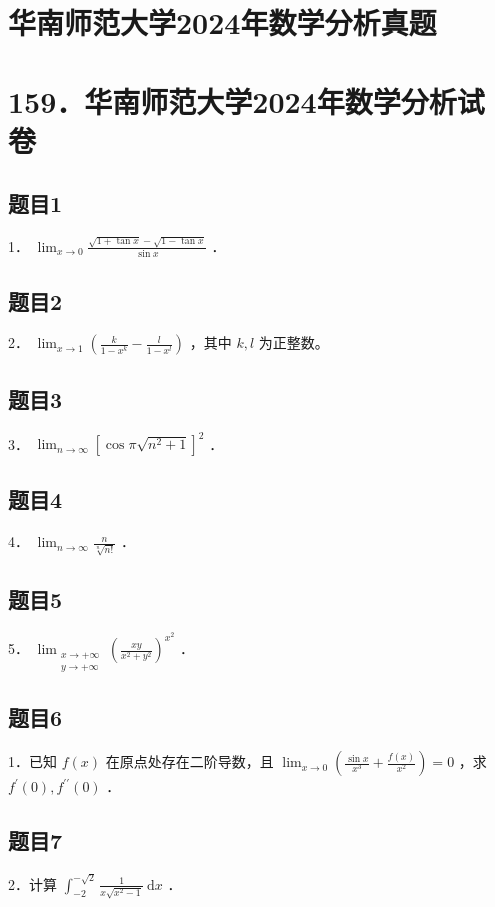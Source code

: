 \documentclass{article}
\begin{document}
\section*{华南师范大学2024年数学分析真题}
\section*{159．华南师范大学2024年数学分析试卷}

\subsection{题目1}
1． \(\lim _{x \rightarrow 0} \frac{\sqrt{1+\tan x}-\sqrt{1-\tan x}}{\sin x}\) ．

\subsection{题目2}
2． \(\lim _{x \rightarrow 1}\left(\frac{k}{1-x^{k}}-\frac{l}{1-x^{l}}\right)\) ，其中 \(k, l\) 为正整数。

\subsection{题目3}
3． \(\lim _{n \rightarrow \infty}\left[\cos \pi \sqrt{n^{2}+1}\right]^{2}\) ．

\subsection{题目4}
4． \(\lim _{n \rightarrow \infty} \frac{n}{\sqrt[n]{n!}}\) ．

\subsection{题目5}
5． \(\lim _{\substack{x \rightarrow+\infty \\ y \rightarrow+\infty}}\left(\frac{x y}{x^{2}+y^{2}}\right)^{x^{2}}\) ．

\subsection{题目6}
1．已知 \(f(x)\) 在原点处存在二阶导数，且 \(\lim _{x \rightarrow 0}\left(\frac{\sin x}{x^{3}}+\frac{f(x)}{x^{2}}\right)=0\) ，求 \(f^{\prime}(0), f^{\prime \prime}(0)\) ．

\subsection{题目7}
2．计算 \(\int_{-2}^{-\sqrt{2}} \frac{1}{x \sqrt{x^{2}-1}} \mathrm{~d} x\) ．
\end{document}
